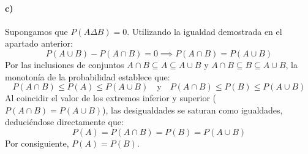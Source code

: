 \begin{problema}
\paragraph{c)}
Supongamos que $P(A \Delta B) = 0$. Utilizando la igualdad demostrada en el apartado anterior:
\[
    P(A \cup B) - P(A \cap B) = 0 \implies P(A \cap B) = P(A \cup B)
\]
Por las inclusiones de conjuntos $A \cap B \subseteq A \subseteq A \cup B$ y $A \cap B \subseteq B \subseteq A \cup B$, la monotonía de la probabilidad establece que:
\[
    P(A \cap B) \le P(A) \le P(A \cup B) \quad \text{y} \quad P(A \cap B) \le P(B) \le P(A \cup B)
\]
Al coincidir el valor de los extremos inferior y superior ($P(A \cap B) = P(A \cup B)$), las desigualdades se saturan como igualdades, deduciéndose directamente que:
\[
    P(A) = P(A \cap B) = P(B) = P(A \cup B)
\]
Por consiguiente, $P(A) = P(B)$.
\end{problema}

\newpage

